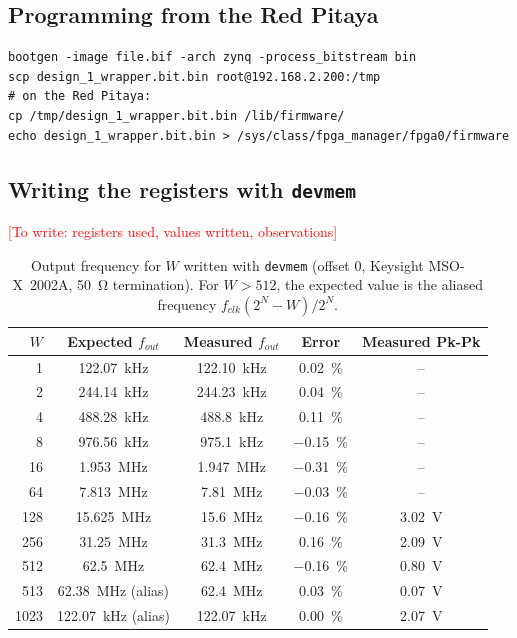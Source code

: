 \documentclass[11pt,a4paper]{article}
\renewcommand{\_}{\oldunderscore\allowbreak}
\newcommand{\todo}[1]{\textcolor{red}{[To write: #1]}}
\begin{document}
\subsection{Programming from the Red Pitaya}
\begin{lstlisting}[style=sh, caption={Creating the .bit.bin and loading it}]
bootgen -image file.bif -arch zynq -process_bitstream bin
scp design_1_wrapper.bit.bin root@192.168.2.200:/tmp
# on the Red Pitaya:
cp /tmp/design_1_wrapper.bit.bin /lib/firmware/
echo design_1_wrapper.bit.bin > /sys/class/fpga_manager/fpga0/firmware
\end{lstlisting}

\subsection{Writing the registers with \texttt{devmem}}
\todo{registers used, values written, observations}

\begin{table}[H]
\centering
\begin{tabular}{rcccc}
\toprule
$W$ & Expected $f_{out}$ & Measured $f_{out}$ & Error & Measured Pk-Pk \\
\midrule
1    & \SI{122.07}{\kilo\hertz} & \SI{122.10}{\kilo\hertz} & \SI{+0.02}{\percent} & -- \\
2    & \SI{244.14}{\kilo\hertz} & \SI{244.23}{\kilo\hertz} & \SI{+0.04}{\percent} & -- \\
4    & \SI{488.28}{\kilo\hertz} & \SI{488.8}{\kilo\hertz}  & \SI{+0.11}{\percent} & -- \\
8    & \SI{976.56}{\kilo\hertz} & \SI{975.1}{\kilo\hertz}  & \SI{-0.15}{\percent} & -- \\
16   & \SI{1.953}{\mega\hertz}  & \SI{1.947}{\mega\hertz}  & \SI{-0.31}{\percent} & -- \\
64   & \SI{7.813}{\mega\hertz}  & \SI{7.81}{\mega\hertz}   & \SI{-0.03}{\percent} & -- \\
128  & \SI{15.625}{\mega\hertz} & \SI{15.6}{\mega\hertz}   & \SI{-0.16}{\percent} & \SI{3.02}{\volt} \\
256  & \SI{31.25}{\mega\hertz}  & \SI{31.3}{\mega\hertz}   & \SI{+0.16}{\percent} & \SI{2.09}{\volt} \\
512  & \SI{62.5}{\mega\hertz}   & \SI{62.4}{\mega\hertz}   & \SI{-0.16}{\percent} & \SI{0.80}{\volt} \\
513  & \SI{62.38}{\mega\hertz} (alias) & \SI{62.4}{\mega\hertz} & \SI{+0.03}{\percent} & \SI{0.07}{\volt} \\
1023 & \SI{122.07}{\kilo\hertz} (alias) & \SI{122.07}{\kilo\hertz} & \SI{0.00}{\percent} & \SI{2.07}{\volt} \\
\bottomrule
\end{tabular}
\caption{Output frequency for $W$ written with \texttt{devmem} (offset 0, Keysight
MSO-X~2002A, \SI{50}{\ohm} termination). For $W > 512$, the expected value is the
aliased frequency $f_{clk}(2^N - W)/2^N$.}\label{tab:devmem}
\end{table}
\end{document}
